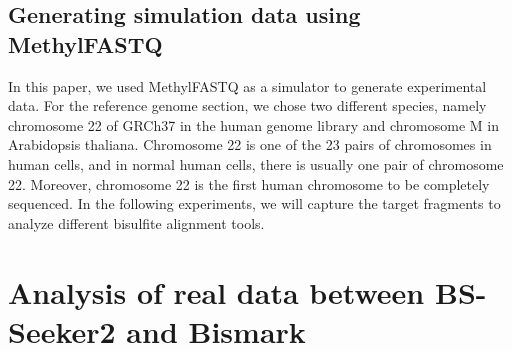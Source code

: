 \documentclass{PHlab-thesis}
\begin{document}
\subsection{Generating simulation data using MethylFASTQ}
In this paper, we used MethylFASTQ as a simulator to generate experimental data. For the reference genome section, we chose two different species, namely chromosome 22 of GRCh37 in the human genome library and chromosome M in Arabidopsis thaliana. Chromosome 22 is one of the 23 pairs of chromosomes in human cells, and in normal human cells, there is usually one pair of chromosome 22. Moreover, chromosome 22 is the first human chromosome to be completely sequenced. In the following experiments, we will capture the target fragments to analyze different bisulfite alignment tools.





\section{Analysis of real data between BS-Seeker2 and Bismark}
\end{document}
